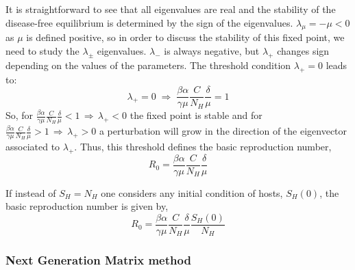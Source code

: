 It is straightforward to see that all eigenvalues are real and
the stability of the disease-free equilibrium is determined by the sign of the
eigenvalues. $\lambda_\mu = -\mu <0$ as $\mu$ is defined positive, so  in order
to discuss the stability of this fixed point, we need to study the
$\lambda_{\pm}$ eigenvalues. $\lambda_{-}$ is always negative, but
$\lambda_{+}$ changes sign depending on the values of the parameters. The
threshold condition $\lambda_{+} = 0$ leads to:
\begin{equation}
    \lambda_{+} = 0 \; \Rightarrow \; \frac{\beta
        \alpha}{\gamma \mu} \frac{C}{N_H}\frac{\delta}{\mu} = 1
    \label{eq:lambda+_general}
\end{equation}
So, for $\displaystyle\frac{\beta \alpha}{\gamma \mu}
    \frac{C}{N_H}\frac{\delta}{\mu}<1 \, \Rightarrow \, \lambda_{+} < 0 $ the
fixed
point is stable and for $\displaystyle\frac{\beta \alpha}{\gamma \mu}
    \frac{C}{N_H}\frac{\delta}{\mu} >1 \, \Rightarrow \, \lambda_{+} > 0 $ a
perturbation will grow in the direction of the eigenvector associated to
$\lambda_{+}$. Thus, this threshold defines the basic reproduction number,
\begin{equation}
    R_0 = \frac{\beta \alpha}{\gamma
        \mu}\frac{C}{N_H}\frac{\delta}{\mu}
\end{equation}

If instead of $S_H=N_H$ one considers any initial condition of
hosts, $S_H(0)$, the basic reproduction number is given by,
\begin{equation}
    R_0 = \frac{\beta \alpha}{\gamma
        \mu}\frac{C}{N_H}\frac{\delta}{\mu}\frac{S_H(0)}{N_H}
\end{equation}

\subsubsection*{Next Generation Matrix method}


